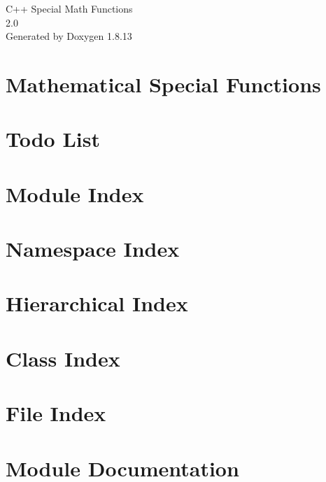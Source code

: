 \documentclass[twoside]{book}
\newcommand{\+}{\discretionary{\mbox{\scriptsize$\hookleftarrow$}}{}{}}
\newcommand{\clearemptydoublepage}{%
  \newpage{\pagestyle{empty}\cleardoublepage}%
}
\begin{document}
\hypersetup{pageanchor=false,
             bookmarksnumbered=true,
             pdfencoding=unicode
            }
\begin{titlepage}
\vspace*{7cm}
\begin{center}%
{\Large C++ Special Math Functions \\[1ex]\large 2.\+0 }\\
\vspace*{1cm}
{\large Generated by Doxygen 1.8.13}\\
\end{center}
\end{titlepage}
\clearemptydoublepage
{}
\tableofcontents
\clearemptydoublepage
{}
\hypersetup{pageanchor=true}

\chapter{Mathematical Special Functions}
\label{index}\hypertarget{index}{}
\chapter{Todo List}
\label{todo}

\chapter{Module Index}

\chapter{Namespace Index}

\chapter{Hierarchical Index}

\chapter{Class Index}

\chapter{File Index}

\chapter{Module Documentation}



\end{document}
